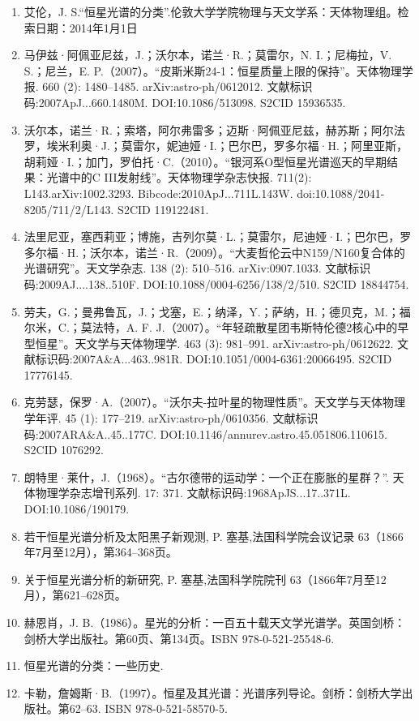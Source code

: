 \begin{enumerate}
\item 艾伦，J. S.“恒星光谱的分类”.伦敦大学学院物理与天文学系：天体物理组。检索日期：2014年1月1日
\item 马伊兹·阿佩亚尼兹，J.；沃尔本，诺兰·R.；莫雷尔，N. I.；尼梅拉，V. S.；尼兰，E. P.（2007）。“皮斯米斯24-1：恒星质量上限的保持”。天体物理学报. 660 (2): 1480–1485. arXiv:astro-ph/0612012. 文献标识码:2007ApJ...660.1480M. DOI:10.1086/513098. S2CID 15936535.
\item 沃尔本，诺兰·R.；索塔，阿尔弗雷多；迈斯·阿佩亚尼兹，赫苏斯；阿尔法罗，埃米利奥·J.；莫雷尔，妮迪娅·I.；巴尔巴，罗多尔福·H.；阿里亚斯，胡莉娅·I.；加门，罗伯托·C.（2010）。“银河系O型恒星光谱巡天的早期结果：光谱中的C III发射线”。天体物理学杂志快报. 711(2): L143.arXiv:1002.3293. Bibcode:2010ApJ...711L.143W. doi:10.1088/2041-8205/711/2/L143. S2CID 119122481.
\item 法里尼亚，塞西莉亚；博施，吉列尔莫·L.；莫雷尔，尼迪娅·I.；巴尔巴，罗多尔福·H.；沃尔本，诺兰·R.（2009）。“大麦哲伦云中N159/N160复合体的光谱研究”。天文学杂志. 138 (2): 510–516. arXiv:0907.1033. 文献标识码:2009AJ....138..510F. DOI:10.1088/0004-6256/138/2/510. S2CID 18844754.
\item 劳夫，G.；曼弗鲁瓦，J.；戈塞，E.；纳泽，Y.；萨纳，H.；德贝克，M.；福尔米，C.；莫法特，A. F. J.（2007）。“年轻疏散星团韦斯特伦德2核心中的早型恒星”。天文学与天体物理学. 463 (3): 981–991. arXiv:astro-ph/0612622. 文献标识码:2007A&A...463..981R. DOI:10.1051/0004-6361:20066495. S2CID 17776145.
\item 克劳瑟，保罗·A.（2007）。“沃尔夫-拉叶星的物理性质”。天文学与天体物理学年评. 45 (1): 177–219. arXiv:astro-ph/0610356. 文献标识码:2007ARA&A..45..177C. DOI:10.1146/annurev.astro.45.051806.110615. S2CID 1076292.
\item 朗特里·莱什，J.（1968）。“古尔德带的运动学：一个正在膨胀的星群？”. 天体物理学杂志增刊系列. 17: 371. 文献标识码:1968ApJS...17..371L. DOI:10.1086/190179.
\item 若干恒星光谱分析及太阳黑子新观测, P. 塞基,法国科学院会议记录 63（1866年7月至12月），第364–368页。
\item 关于恒星光谱分析的新研究, P. 塞基,法国科学院院刊 63（1866年7月至12月），第621–628页。
\item 赫恩肖，J. B.（1986）。星光的分析：一百五十载天文学光谱学。英国剑桥：剑桥大学出版社。第60页、第134页。ISBN 978-0-521-25548-6.
\item 恒星光谱的分类：一些历史.
\item 卡勒，詹姆斯·B.（1997）。恒星及其光谱：光谱序列导论。剑桥：剑桥大学出版社。第62–63. ISBN 978-0-521-58570-5.

\end{enumerate}
